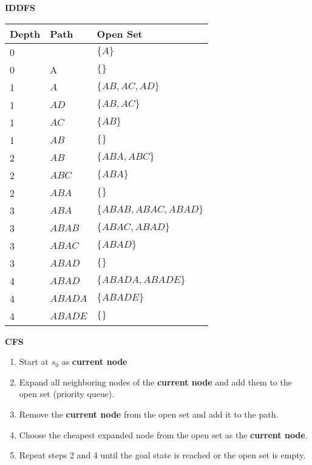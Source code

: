 \begin{example} \textbf{IDDFS}
    \begin{center}
        \begin{tabular}{lll}
        \toprule
        \textbf{Depth} & \textbf{Path} & \textbf{Open Set} \\
        \midrule
        0 & & $\{A\}$ \\
        0 & A & $\{\}$ \\
        \midrule
        1 & $A$ & $\{AB, AC, AD\}$ \\
        1 & $AD$ & $\{AB, AC\}$ \\
        1 & $AC$ & $\{AB\}$ \\
        1 & $AB$ & $\{\}$ \\
        \midrule
        2 & $AB$ & $\{ABA, ABC\}$ \\
        2 & $ABC$ & $\{ABA\}$ \\
        2 & $ABA$ & $\{\}$ \\
        \midrule
        3 & $ABA$ & $\{ABAB, ABAC, ABAD\}$ \\
        3 & $ABAB$ & $\{ABAC, ABAD\}$ \\
        3 & $ABAC$ & $\{ABAD\}$ \\
        3 & $ABAD$ & $\{\}$ \\
        \midrule
        4 & $ABAD$ & $\{ABADA, ABADE\}$ \\
        4 & $ABADA$ & $\{ABADE\}$ \\
        4 & $ABADE$ & $\{\}$ \\
        \bottomrule
        \end{tabular}
    \end{center}
\end{example}
\newpage

\begin{process} \textbf{CFS}
    \begin{enumerate}
        \item Start at $s_0$ as \textbf{current node}
        \item Expand all neighboring nodes of the \textbf{current node} and add them to the open set (priority queue).
        \item Remove the \textbf{current node} from the open set and add it to the path. 
        \item Choose the cheapest expanded node from the open set as the \textbf{current node}.
        \item Repeat steps 2 and 4 until the goal state is reached or the open set is empty.
    \end{enumerate}
\end{process}

